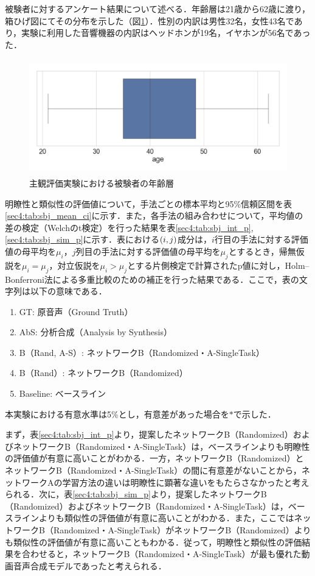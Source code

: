 被験者に対するアンケート結果について述べる．年齢層は21歳から62歳に渡り，箱ひげ図にてその分布を示した（図\ref{sec4:fig:age}）．性別の内訳は男性32名，女性43名であり，実験に利用した音響機器の内訳はヘッドホンが19名，イヤホンが56名であった．
\begin{figure}[b]
    \centering
    \includegraphics[height=50mm]{./figure/sec4/sbj/age.png}
    \caption{主観評価実験における被験者の年齢層}
    \label{sec4:fig:age}
\end{figure}

明瞭性と類似性の評価値について，手法ごとの標本平均と95\%信頼区間を表\ref{sec4:tab:sbj_mean_ci}に示す．また，各手法の組み合わせについて，平均値の差の検定（Welchのt検定）を行った結果を表\ref{sec4:tab:sbj_int_p}, \ref{sec4:tab:sbj_sim_p}に示す．表における$\left(i, j\right)$成分は，$i$行目の手法に対する評価値の母平均を$\mu_{i}$，$j$列目の手法に対する評価値の母平均を$\mu_{j}$とするとき，帰無仮説を$\mu_{i} = \mu_{j}$，対立仮説を$\mu_{i} > \mu_{j}$とする片側検定で計算されたp値に対し，Holm–Bonferroni法による多重比較のための補正を行った結果である．ここで，表の文字列は以下の意味である．
\begin{enumerate}
    \item GT: 原音声（Ground Truth）
    \item AbS: 分析合成（Analysis by Synthesis）
    \item B（Rand, A-S）: ネットワークB（Randomized・A-SingleTask）
    \item B（Rand）: ネットワークB（Randomized）
    \item Baseline: ベースライン
\end{enumerate}
本実験における有意水準は5\%とし，有意差があった場合を$\ast$で示した．

まず，表\ref{sec4:tab:sbj_int_p}より，提案したネットワークB（Randomized）およびネットワークB（Randomized・A-SingleTask）は，ベースラインよりも明瞭性の評価値が有意に高いことがわかる．一方，ネットワークB（Randomized）とネットワークB（Randomized・A-SingleTask）の間に有意差がないことから，ネットワークAの学習方法の違いは明瞭性に顕著な違いをもたらさなかったと考えられる．次に，表\ref{sec4:tab:sbj_sim_p}より，提案したネットワークB（Randomized）およびネットワークB（Randomized・A-SingleTask）は，ベースラインよりも類似性の評価値が有意に高いことがわかる．また，ここではネットワークB（Randomized・A-SingleTask）がネットワークB（Randomized）よりも類似性の評価値が有意に高いこともわかる．従って，明瞭性と類似性の評価結果を合わせると，ネットワークB（Randomized・A-SingleTask）が最も優れた動画音声合成モデルであったと考えられる．

